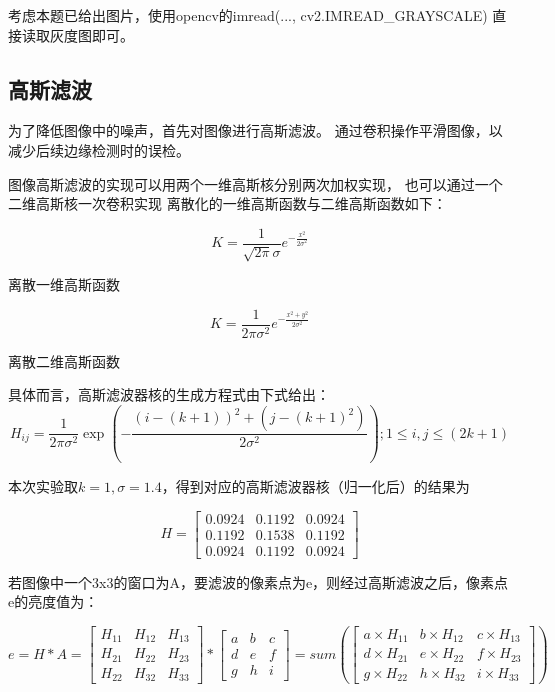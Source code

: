 \documentclass{article}
\begin{document}
    考虑本题已给出图片，使用opencv的imread(..., cv2.IMREAD\_GRAYSCALE)
    直接读取灰度图即可。

\subsection{高斯滤波}
    为了降低图像中的噪声，首先对图像进行高斯滤波。
    通过卷积操作平滑图像，以减少后续边缘检测时的误检。

    图像高斯滤波的实现可以用两个一维高斯核分别两次加权实现，
    也可以通过一个二维高斯核一次卷积实现
    离散化的一维高斯函数与二维高斯函数如下：

    \[K = \frac{1}{\sqrt{2\pi}\sigma}e^{-\frac{x^2}{2\sigma^2}}\]
\begin{center}
    离散一维高斯函数
\end{center}

    \[K = \frac{1}{2\pi\sigma^2}e^{-\frac{x^2 + y^2}{2\sigma^2}}\]

\begin{center}
    离散二维高斯函数
\end{center}

    具体而言，高斯滤波器核的生成方程式由下式给出：
    \[H_{ij} = \frac{1}{2\pi\sigma^2}\exp(-\frac{(i - (k + 1))^2 + (j - (k + 1)^2)}{2\sigma^2}); 1\leq i, j \leq (2k + 1)\]

    本次实验取\(k = 1, \sigma = 1.4\)，得到对应的高斯滤波器核（归一化后）的结果为

\[
H = \begin{bmatrix}
0.0924 & 0.1192 & 0.0924 \\
0.1192 & 0.1538 & 0.1192 \\
0.0924 & 0.1192 & 0.0924
\end{bmatrix}
\]

若图像中一个3x3的窗口为A，要滤波的像素点为e，则经过高斯滤波之后，像素点e的亮度值为：

\[
e = H * A = \begin{bmatrix}
H_{11} & H_{12} & H_{13} \\
H_{21} & H_{22} & H_{23} \\
H_{22} & H_{32} & H_{33}
\end{bmatrix}
*
\begin{bmatrix}
a & b & c \\
d & e & f \\
g & h & i
\end{bmatrix}
=
sum\left(\begin{bmatrix}
a\times H_{11} & b\times H_{12} & c\times H_{13} \\
d\times H_{21} & e\times H_{22} & f\times H_{23} \\
g\times H_{22} & h\times H_{32} & i\times H_{33}
\end{bmatrix}\right)
\]
\end{document}
